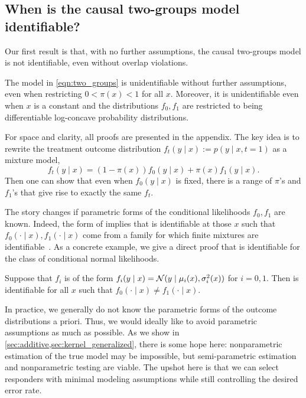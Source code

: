 %

%

\subsection{When is the causal two-groups model identifiable?}

%

Our first result is that, with no further assumptions, the causal two-groups model is not identifiable, even without overlap violations.
\begin{proposition}
\label{thm:unident}
The model in \cref{eqn:two_groups} is unidentifiable without further assumptions, even when restricting $0 < \pi(x) < 1$ for all $x$. Moreover, it is unidentifiable even when $x$ is a constant and the distributions $f_0, f_1$ are restricted to being differentiable log-concave probability distributions.
\end{proposition}
For space and clarity, all proofs are presented in the appendix. The key idea is to rewrite the treatment outcome distribution $f_t(y \mid x) := p(y \mid x, t=1)$ as a mixture model,
\begin{equation}
\label{eqn:treatment-mixture}
f_t(y \mid x) = (1-\pi(x)) f_0(y \mid x) + \pi(x) f_1(y \mid x).
\end{equation}
Then one can show that even when $f_0(y \mid x)$ is fixed, there is a range of $\pi$'s and $f_1$'s that give rise to exactly the same $f_t$.

The story changes if parametric forms of the conditional likelihoods $f_0, f_1$ are known. Indeed, the form of  implies that  is identifiable at those $x$ such that $f_0(\cdot \mid x), f_1(\cdot \mid x)$ come from a family for which finite mixtures are identifiable~\citep{teicher:1963:identifiability-finite, yakowitz:spragins:1968:identifiability-finite}. As a concrete example, we give a direct proof that  is identifiable for the class of conditional normal likelihoods.

\begin{proposition}
\label{prop:normal-identifiability}
Suppose that $f_i$ is of the form
$f_i(y \mid x) = \mathcal{N}(y \mid \mu_i(x), \sigma_i^2(x))$
for $i=0,1$. Then  is identifiable for all $x$ such that $f_0(\cdot \mid x) \neq f_1(\cdot \mid x)$.
\end{proposition}

%
%
In practice, we generally do not know the parametric forms of the outcome distributions a priori. Thus, we would ideally like to avoid parametric assumptions as much as possible.
As we show in \cref{sec:additive,sec:kernel_generalized}, there is some hope here: nonparametric estimation of the true model may be impossible, but semi-parametric estimation and nonparametric testing are viable. The upshot here is that we can select responders with minimal modeling assumptions while still controlling the desired error rate.

